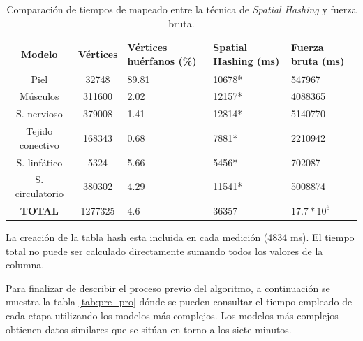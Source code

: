 \begin{table}[h]

\begin{threeparttable}
\centering

\caption{Comparación de tiempos de mapeado entre la técnica de \emph{Spatial Hashing} y fuerza bruta. }
\label{tab:bruteforce}
\begin{tabular}{|c|c|x{25mm}|x{25mm}|x{25mm}|}

\hline
\textbf{Modelo} & \textbf{Vértices} & \textbf{Vértices  huérfanos (\%)}  & \textbf{Spatial Hashing (ms)} & \textbf{Fuerza bruta (ms)} \\ 
\hline
Piel             &32748      &89.81   &10678* &547967\\
\hline
Músculos         &311600     &2.02    &12157* &4088365\\ 
\hline
S. nervioso      &379008     &1.41    &12814* &5140770\\ 
\hline
Tejido conectivo &168343     &0.68    &7881*  &2210942\\ 
\hline
S. linfático     &5324       &5.66    &5456*  &702087\\ 
\hline
S. circulatorio  &380302     &4.29    &11541* &5008874\\ 
\hline
\textbf{TOTAL}   &1277325    &4.6     &36357  &$17.7*10^6$ \\
\hline

\end{tabular}
\begin{tablenotes}
      \small
      \item * La creación de la \ac{tabla hash} esta incluida en cada medición (4834 ms). El tiempo total no puede ser calculado directamente sumando todos los valores de la columna.
    \end{tablenotes}

\end{threeparttable}
\end{table}


Para finalizar de describir el proceso previo del algoritmo, a continuación se muestra la tabla \ref{tab:pre_pro} dónde se pueden consultar el tiempo empleado de cada etapa utilizando los modelos más complejos. Los modelos más complejos obtienen datos similares que se sitúan en torno a los siete minutos.






